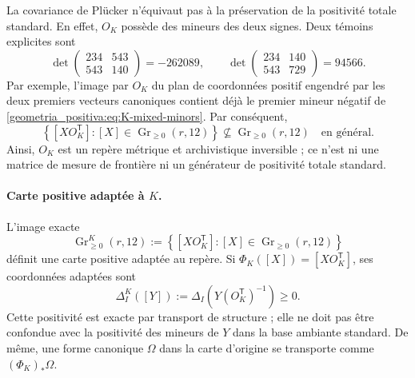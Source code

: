 La covariance de Plücker n’équivaut pas à la préservation de la positivité totale standard. En effet, \(O_K\) possède des mineurs des deux signes. Deux témoins explicites sont
\begin{equation}
 \det\begin{pmatrix}234&543\\543&140\end{pmatrix}=-262089,
 \qquad
 \det\begin{pmatrix}234&140\\543&729\end{pmatrix}=94566.
 \label{geometria_positiva:eq:K-mixed-minors}
\end{equation}
Par exemple, l’image par \(O_K\) du plan de coordonnées positif engendré par les deux premiers vecteurs canoniques contient déjà le premier mineur négatif de \eqref{geometria_positiva:eq:K-mixed-minors}. Par conséquent,
\begin{equation}
 \left\{[XO_K^{\mathsf T}]:
 [X]\in\operatorname{Gr}_{\ge0}(r,12)\right\}
 \not\subseteq\operatorname{Gr}_{\ge0}(r,12)
 \quad\text{en général}.
 \label{geometria_positiva:eq:K-not-standard-totally-positive}
\end{equation}
Ainsi, \(O_K\) est un repère métrique et archivistique inversible ; ce n’est ni une matrice de mesure de frontière ni un générateur de positivité totale standard.

\paragraph{Carte positive adaptée à \(K\).}
L’image exacte
\begin{equation}
 \operatorname{Gr}_{\ge0}^{K}(r,12)
 :=\left\{[XO_K^{\mathsf T}]:
 [X]\in\operatorname{Gr}_{\ge0}(r,12)\right\}
 \label{geometria_positiva:eq:K-adapted-positive-chart}
\end{equation}
définit une carte positive adaptée au repère. Si \(\Phi_K([X])=[XO_K^{\mathsf T}]\), ses coordonnées adaptées sont
\begin{equation}
 \Delta_I^K([Y])
 :=\Delta_I\!\left(Y(O_K^{\mathsf T})^{-1}\right)\ge0.
 \label{geometria_positiva:eq:K-adapted-plucker}
\end{equation}
Cette positivité est exacte par transport de structure ; elle ne doit pas être confondue avec la positivité des mineurs de \(Y\) dans la base ambiante standard. De même, une forme canonique \(\Omega\) dans la carte d’origine se transporte comme \((\Phi_K)_*\Omega\).

